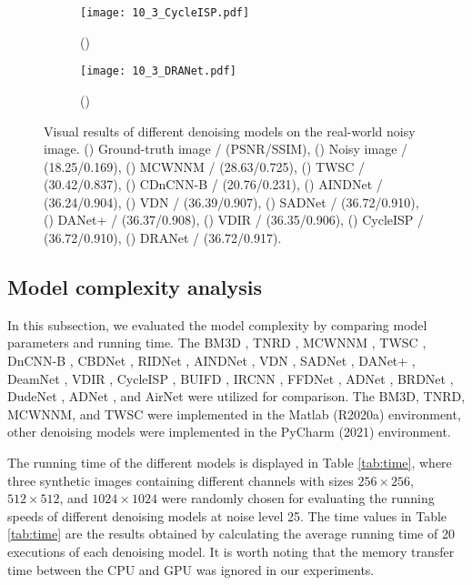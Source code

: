\documentclass[3p,times]{elsarticle}
\begin{document}
\begin{figure*}[htbp]
	\begin{subfigure}{0.225\linewidth}
		\centering
		\texttt{[image: 10\_3\_CycleISP.pdf]}
		\caption{()}
	\end{subfigure}
    \centering
	\begin{subfigure}{0.225\linewidth}
		\centering
		\texttt{[image: 10\_3\_DRANet.pdf]}
		\caption{()}
	\end{subfigure}
\caption{Visual results of different denoising models on the real-world noisy image. () Ground-truth image / (PSNR/SSIM), () Noisy image / (18.25/0.169), () MCWNNM / (28.63/0.725), () TWSC / (30.42/0.837), () CDnCNN-B / (20.76/0.231), () AINDNet / (36.24/0.904), () VDN / (36.39/0.907), () SADNet / (36.72/0.910), () DANet+ / (36.37/0.908), () VDIR / (36.35/0.906), () CycleISP / (36.72/0.910), () DRANet / (36.72/0.917).}
\label{fig:10_3}
\end{figure*}

\subsection{Model complexity analysis}
In this subsection, we evaluated the model complexity by comparing model parameters and running time. The BM3D \cite{Dabov2007}, TNRD \cite{Chen2017}, MCWNNM \cite{Xu2017}, TWSC \cite{Xu2018}, DnCNN-B \cite{Zhang2017}, CBDNet \cite{Guo2019}, RIDNet \cite{Anwar2019}, AINDNet \cite{Kim2020}, VDN \cite{Yue2019}, SADNet \cite{Chang2020}, DANet+ \cite{Yue2020}, DeamNet \cite{Ren2021}, VDIR \cite{Soh2022}, CycleISP \cite{Zamir2020}, BUIFD \cite{Helou2020}, IRCNN \cite{ZhangZGZ2017}, FFDNet \cite{Zhang2018}, ADNet \cite{TianX2020}, BRDNet \cite{Tian2020}, DudeNet \cite{Tian2021}, ADNet \cite{TianX2020}, and AirNet \cite{Li2022} were utilized for comparison. The BM3D, TNRD, MCWNNM, and TWSC were implemented in the Matlab (R2020a) environment, other denoising models were implemented in the PyCharm (2021) environment.

The running time of the different models is displayed in Table \ref{tab:time}, where three synthetic images containing different channels with sizes $256\times256$, $512\times512$, and $1024\times1024$ were randomly chosen for evaluating the running speeds of different denoising models at noise level 25. The time values in Table \ref{tab:time} are the results obtained by calculating the average running time of 20 executions of each denoising model. It is worth noting that the memory transfer time between the CPU and GPU was ignored in our experiments.
\end{document}
